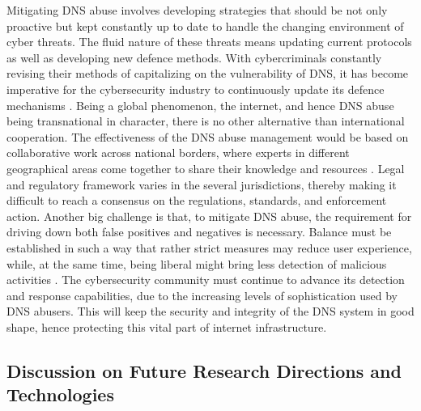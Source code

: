 Mitigating DNS abuse involves developing strategies that should be not only proactive but kept constantly up to date to handle the changing environment of cyber threats. The fluid nature of these threats means updating current protocols as well as developing new defence methods. With cybercriminals constantly revising their methods of capitalizing on the vulnerability of DNS, it has become imperative for the cybersecurity industry to continuously update its defence mechanisms \cite{bhattacharya2023dns}. Being a global phenomenon, the internet, and hence DNS abuse being transnational in character, there is no other alternative than international cooperation. The effectiveness of the DNS abuse management would be based on collaborative work across national borders, where experts in different geographical areas come together to share their knowledge and resources \cite{altulaihan2022cybersecurity}. Legal and regulatory framework varies in the several jurisdictions, thereby making it difficult to reach a consensus on the regulations, standards, and enforcement action. Another big challenge is that, to mitigate DNS abuse, the requirement for driving down both false positives and negatives is necessary. Balance must be established in such a way that rather strict measures may reduce user experience, while, at the same time, being liberal might bring less detection of malicious activities \cite{lyu2022survey}. The cybersecurity community must continue to advance its detection and response capabilities, due to the increasing levels of sophistication used by DNS abusers. This will keep the security and integrity of the DNS system in good shape, hence protecting this vital part of internet infrastructure.

\subsection{Discussion on Future Research Directions and Technologies}

